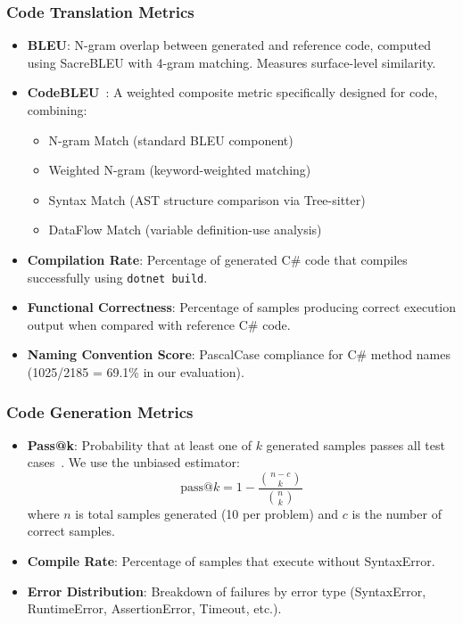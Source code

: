 \documentclass[conference]{IEEEtran}
\begin{document}
\subsubsection{Code Translation Metrics}
\begin{itemize}
    \item \textbf{BLEU}: N-gram overlap between generated and reference code, computed using SacreBLEU with 4-gram matching. Measures surface-level similarity.
    
    \item \textbf{CodeBLEU}~\cite{ren2020codebleu}: A weighted composite metric specifically designed for code, combining:
    \begin{itemize}
        \item N-gram Match (standard BLEU component)
        \item Weighted N-gram (keyword-weighted matching)
        \item Syntax Match (AST structure comparison via Tree-sitter)
        \item DataFlow Match (variable definition-use analysis)
    \end{itemize}
    
    \item \textbf{Compilation Rate}: Percentage of generated C\# code that compiles successfully using \texttt{dotnet build}.
    
    \item \textbf{Functional Correctness}: Percentage of samples producing correct execution output when compared with reference C\# code.
    
    \item \textbf{Naming Convention Score}: PascalCase compliance for C\# method names (1025/2185 = 69.1\% in our evaluation).
\end{itemize}

\subsubsection{Code Generation Metrics}
\begin{itemize}
    \item \textbf{Pass@k}: Probability that at least one of $k$ generated samples passes all test cases~\cite{chen2021codex}. We use the unbiased estimator:
    \begin{equation}
    \text{pass@}k = 1 - \frac{\binom{n-c}{k}}{\binom{n}{k}}
    \end{equation}
    where $n$ is total samples generated (10 per problem) and $c$ is the number of correct samples.
    
    \item \textbf{Compile Rate}: Percentage of samples that execute without SyntaxError.
    
    \item \textbf{Error Distribution}: Breakdown of failures by error type (SyntaxError, RuntimeError, AssertionError, Timeout, etc.).
\end{itemize}
\end{document}
